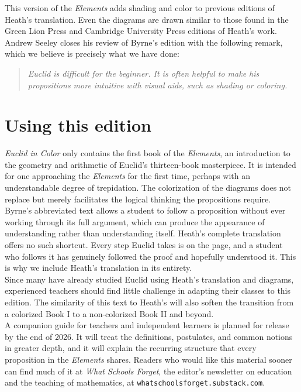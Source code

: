 \documentclass[12pt, twoside]{memoir}
\begin{document}
This version of the \textit{Elements} adds shading and color to previous editions of Heath's translation. Even the diagrams are drawn similar to those found in the Green Lion Press and Cambridge University Press editions of Heath's work. Andrew Seeley closes his review of Byrne's edition with the following remark, which we believe is precisely what we have done:
\begin{quotation}
\noindent\itshape
{}
Euclid is difficult for the beginner. It is often helpful to make his propositions more intuitive with visual aids, such as shading or coloring.
\end{quotation}

\section*{Using this edition}
\textit{Euclid in Color} only contains the first book of the \textit{Elements}, an introduction to the geometry and arithmetic of Euclid's thirteen-book masterpiece. It is intended for one approaching the \textit{Elements} for the first time, perhaps with an understandable degree of trepidation. The colorization of the diagrams does not replace but merely facilitates the logical thinking the propositions require. Byrne's abbreviated text allows a student to follow a proposition without ever working through its full argument, which can produce the appearance of understanding rather than understanding itself. Heath's complete translation offers no such shortcut. Every step Euclid takes is on the page, and a student who follows it has genuinely followed the proof and hopefully understood it. This is why we include Heath's translation in its entirety. \\

Since many have already studied Euclid using Heath's translation and diagrams, experienced teachers should find little challenge in adapting their classes to this edition. The similarity of this text to Heath's will also soften the transition from a colorized Book I to a non-colorized Book II and beyond. \\

A companion guide for teachers and independent learners is planned for release by the end of 2026. It will treat the definitions, postulates, and common notions in greater depth, and it will explain the recurring structure that every proposition in the \textit{Elements} shares. Readers who would like this material sooner can find much of it at \textit{What Schools Forget}, the editor's newsletter on education and the teaching of mathematics, at \texttt{whatschoolsforget.substack.com}.
\end{document}
